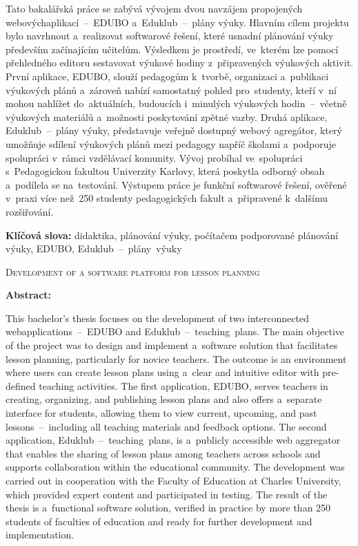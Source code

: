\documentclass[male,czech,api_bc]{kitheses}
\newcommand{\nazeven}{Development of a software platform for lesson planning}       %
\begin{document}
Tato bakalářská práce se zabývá vývojem dvou navzájem propojených webových\break aplikací~--~EDUBO a~Eduklub~--~plány výuky. Hlavním cílem projektu bylo navrhnout a~realizovat softwarové řešení, které usnadní plánování výuky především začínajícím učitelům. Výsledkem je prostředí, ve~kterém lze pomocí přehledného editoru sestavovat výukové hodiny z~připravených výukových aktivit. První aplikace, EDUBO, slouží pedagogům k~tvorbě, organizaci a~publikaci výukových plánů a~zároveň nabízí samostatný pohled pro~studenty, kteří v~ní mohou nahlížet do~aktuálních, budoucích i~minulých výukových hodin~--~včetně výukových materiálů a~možnosti poskytování zpětné vazby. Druhá aplikace, Eduklub~--~plány výuky, představuje veřejně dostupný webový agregátor, který umožňuje sdílení výukových plánů mezi pedagogy napříč školami a~podporuje spolupráci v~rámci vzdělávací komunity. Vývoj probíhal ve~spolupráci s~Pedagogickou fakultou Univerzity Karlovy, která poskytla odborný obsah a~podílela se na~testování. Výstupem práce je funkční softwarové řešení, ověřené v~praxi více než~250 studenty pedagogických fakult a~připravené k~dalšímu rozšiřování.

\textbf{Klíčová slova:} didaktika, plánování výuky, počítačem podporované plánování výuky, EDUBO, Eduklub~--~plány~výuky

\bigskip


\textsc{\nazeven}

\textbf{Abstract:}

This bachelor's thesis focuses on the development of two interconnected web\break applications~--~EDUBO and Eduklub~--~teaching~plans. The main objective of the project was to design and implement a~software solution that facilitates lesson planning, particularly for novice teachers. The outcome is an environment where users can create lesson plans using a~clear and intuitive editor with pre-defined teaching activities. The first application, EDUBO, serves teachers in creating, organizing, and publishing lesson plans and also offers a~separate interface for students, allowing them to view current, upcoming, and past lessons~--~including all teaching materials and feedback options. The second application, Eduklub~--~teaching~plans, is a~publicly accessible web aggregator that enables the sharing of lesson plans among teachers across schools and supports collaboration within the educational community. The development was carried out in cooperation with the Faculty of Education at Charles University, which provided expert content and participated in testing. The result of the thesis is a~functional software solution, verified in practice by more than 250 students of faculties of education and ready for further development and implementation.
\end{document}
